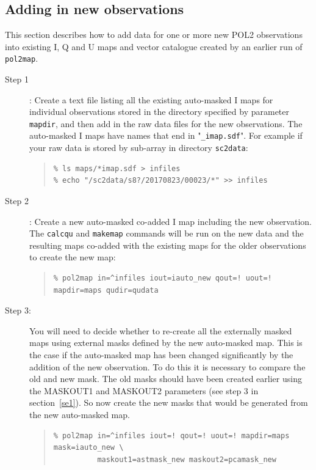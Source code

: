 \documentclass[twoside,11pt]{starlink}
\begin{document}
\subsection{Adding in new observations\label{sec:addin}}
This section describes how to add data for one or more new POL2
observations into existing I, Q and U maps and vector catalogue created
by an earlier run of \texttt{pol2map}.

\begin{description}
\item[Step 1]:  Create a text file listing all the existing auto-masked I maps for
individual observations stored in the directory specified by parameter
\texttt{mapdir}, and then add in the raw data files for the new
observations. The auto-masked I maps have names that end in
"\texttt{\_imap.sdf}". For example if your raw data is stored by sub-array
in directory \texttt{sc2data}:

\begin{quote}
\begin{verbatim}
% ls maps/*imap.sdf > infiles
% echo "/sc2data/s8?/20170823/00023/*" >> infiles
\end{verbatim}
\end{quote}

\item[Step 2]:  Create a new auto-masked co-added I map including the new
observation. The \texttt{calcqu} and \texttt{makemap} commands will
be run on the new data and the resulting maps co-added with the existing
maps for the older observations to create the new map:

\begin{quote}
\begin{verbatim}
% pol2map in=^infiles iout=iauto_new qout=! uout=! mapdir=maps qudir=qudata
\end{verbatim}
\end{quote}

\item[Step 3:] You will need to decide whether to re-create all the externally
masked maps using external masks defined by the new auto-masked map. This is
the case if the auto-masked map has been changed significantly by the addition
of the new observation. To do this it is necessary to compare the old and
new mask. The old masks should have been created earlier using the
MASKOUT1 and MASKOUT2 parameters (see step 3 in section~\ref{se1}). So now
create the new masks that would be generated from the new auto-masked map.
\begin{quote}
\begin{verbatim}
% pol2map in=^infiles iout=! qout=! uout=! mapdir=maps mask=iauto_new \
          maskout1=astmask_new maskout2=pcamask_new
\end{verbatim}
\end{quote}


\end{description}
\end{document}
